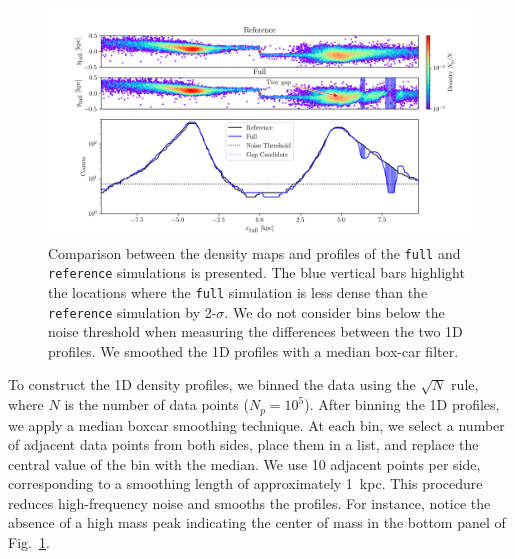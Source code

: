         \begin{figure}
            \centering
            \includegraphics[width=\linewidth, trim=20 0 15 0]{images/monte-carlo-009-pouliasis2017pii-GCNBody-2000-milisigma-5-noisefactor-20-boxcarindexlength-shifted-0.png}
            \caption[Comparison between the density maps and profiles of the \texttt{full} and \texttt{reference} simulations]{Comparison between the density maps and profiles of the \texttt{full} and \texttt{reference} simulations is presented. The blue vertical bars highlight the locations where the \texttt{full} simulation is less dense than the \texttt{reference} simulation by 2-$\sigma$. We do not consider bins below the noise threshold when measuring the differences between the two 1D profiles. We smoothed the 1D profiles with a median box-car filter.}
            \label{fig:profiles}
        \end{figure}

        To construct the 1D density profiles, we binned the data using the $\sqrt{N}$ rule, where $N$ is the number of data points ($N_p = 10^5$). After binning the 1D profiles, we apply a median boxcar smoothing technique. At each bin, we select a number of adjacent data points from both sides, place them in a list, and replace the central value of the bin with the median. We use 10 adjacent points per side, corresponding to a smoothing length of approximately 1~kpc. This procedure reduces high-frequency noise and smooths the profiles. For instance, notice the absence of a high mass peak indicating the center of mass in the bottom panel of Fig.~\ref{fig:profiles}.

